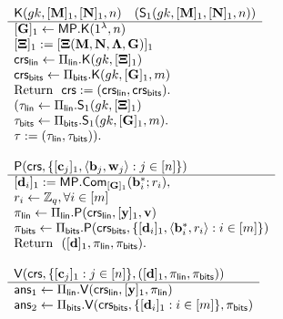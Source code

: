 \begin{figure}
\begin{\algSize}
$$
\begin{array}{l}
\begin{array}{l}
\algK(\gk,[\matr{M}]_1,[\matr{N}]_1,n)
\quad (\mathsf{S}_1(\gk,[\matr{M}]_1,[\matr{N}]_1,n))
\\
\hline
[\matr{G}]_1 \gets \MP.\algK(1^\lambda,n)\\
{[\matr{\Xi}]_1 := [\matr{\Xi}(\matr{M},\matr{N},\matr{\Lambda},\matr{G})]_1}\\
\crs_\sflin\gets\Pi_\sflin.\algK(\gk,[\matr{\Xi}]_1)\\
\crs_\sfbits\gets\Pi_\sfbits.\algK(\gk,[\matr{G}]_1,\lb)\\
\text{Return } \ \crs:=(\crs_\sflin,\crs_\sfbits).\\
(\tau_\sflin\gets\Pi_\sflin.\algS_1(\gk,[\matr{\Xi}]_1)\\
\tau_\sfbits\gets\Pi_\sfbits.\algS_1(\gk,[\matr{G}]_1,\lb).\\
\tau := (\tau_\sflin,\tau_\sfbits)).\\
\\
\end{array}
\\
\begin{array}{l}
{\algP(\mathsf{crs}, \{[\vecb{c}_j]_1,\langle \vecb{b}_j,\vecb{w}_j\rangle:j\in[n]\})}\\
\hline
{[\vecb{d}_i]_1} := \MP.\Com_{[\matr{G}]_1}(\vecb{b}_i^*;r_i),\\
r_i \gets\Z_q, \forall i\in[\lb]\\
\pi_\sflin \gets 
    \Pi_\sflin.\algP
    (
        \crs_\sflin,
            [\vecb{y}]_1,
            \vecb{v}
    )\\
\pi_\sfbits \gets
    \Pi_\sfbits.\algP
    (
        \crs_\sfbits,
        \{[\matr{d}_i]_1, \langle\matr{b}^*_i,r_i\rangle:i \in[\lb]\}
    )\\
\text{Return } \  ([\vecb{d}]_1,\pi_\sflin,\pi_\sfbits). \\
\\
\end{array}
\\
\begin{array}{l}
{\algV(\mathsf{crs},\{[\vecb{c}_j]_1:j\in[n]\},([\vecb{d}]_1,\pi_\sflin,\pi_\sfbits))}\\
\hline
\mathsf{ans}_1 \gets
    \Pi_\sflin.\algV
    (
        \crs_\sflin,
            [\vecb{y}]_1,
        \pi_\sflin
    )\\
\mathsf{ans}_2 \gets \Pi_\sfbits.\algV(\crs_\sfbits,\{[\vecb{d}_i]_1:i\in[\lb]\},\pi_\sfbits)\\

\end{array}
\end{array}$$
\end{\algSize}
\end{figure}
